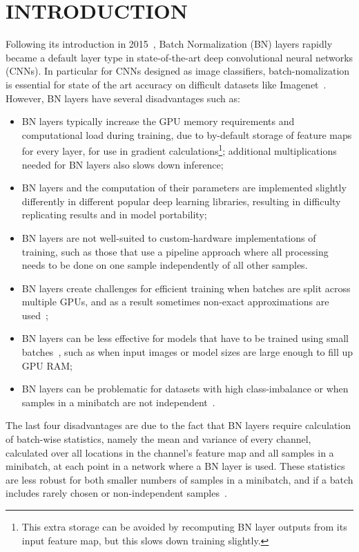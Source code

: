 \documentclass[conference]{IEEEtran}
\begin{document}
\IEEEpeerreviewmaketitle

\section{INTRODUCTION}\label{S:1}


Following its introduction in 2015~\cite{Ioffe.15}, Batch Normalization (BN) layers rapidly became a default layer type in state-of-the-art deep convolutional neural networks (CNNs). In particular for CNNs designed as image classifiers, batch-nomalization is essential for state of the art accuracy on difficult datasets like Imagenet~\cite{He.15a}. However, BN layers have several disadvantages such as:
\begin{itemize}
\item BN layers typically increase the GPU memory requirements and computational load  during training, due to by-default storage of  feature maps for every layer, for use in gradient calculations\footnote{This extra storage can be avoided by recomputing BN layer outputs from its input feature map, but this slows down training slightly.}; additional multiplications needed for BN layers also slows down inference;
\item BN layers and the computation of their parameters are implemented slightly differently in different popular deep learning libraries, resulting in difficulty replicating results and in model portability;
\item BN layers are not well-suited to custom-hardware implementations of training, such as those that use a pipeline approach where all processing needs to be done on one sample independently of all other samples.
\item BN layers create challenges for efficient training when batches are split across multiple GPUs, and as a result sometimes non-exact approximations are used~\cite{Goyal.17};
\item  BN layers can be less effective for models that have to be trained using small batches~\cite{Wu.18}, such as when input images or model sizes are  large enough to fill up GPU RAM;
\item BN  layers can be problematic for datasets with high class-imbalance or when samples in a minibatch are not independent~\cite{Ioffe.17}.
\end{itemize}
The last four disadvantages are due to the fact that BN layers require calculation of batch-wise statistics, namely the mean and variance  of every channel, calculated over all locations in the channel's feature map and all samples in a minibatch, at each point in a network where a BN layer is used. These statistics are less robust for both smaller numbers of samples in a minibatch, and if a batch includes rarely chosen or non-independent samples~\cite{Ioffe.17}.
\end{document}
